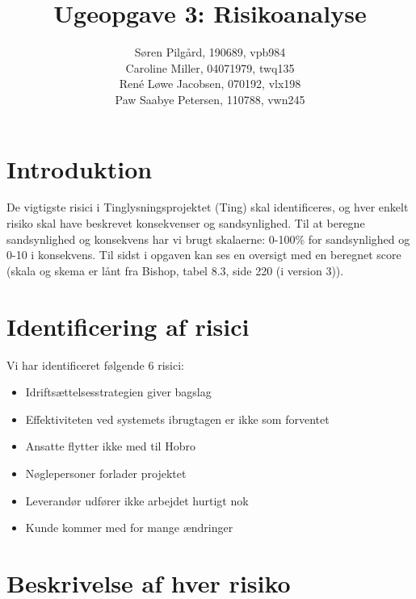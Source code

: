 \documentclass[10pt,a4paper,danish]{article}
\title{Ugeopgave 3: Risikoanalyse}
\author{Søren Pilgård, 190689, vpb984\\
Caroline Miller, 04071979, twq135\\
René Løwe Jacobsen, 070192, vlx198\\
Paw Saabye Petersen, 110788, vwn245}
\begin{document}
\maketitle
\newpage


\section{Introduktion}
De vigtigste risici i Tinglysningsprojektet (Ting) skal identificeres, og hver enkelt risiko skal have beskrevet konsekvenser og sandsynlighed. Til at beregne sandsynlighed og konsekvens har vi brugt skalaerne: 0-100\% for sandsynlighed og 0-10 i konsekvens. Til sidst i opgaven kan ses en oversigt med en beregnet score (skala og skema er lånt fra Bishop, tabel 8.3, side 220 (i version 3)).

\section{Identificering af risici}
Vi har identificeret følgende 6 risici:
\begin{itemize}
\item Idriftsættelsesstrategien giver bagslag
\item Effektiviteten ved systemets ibrugtagen er ikke som forventet
\item Ansatte flytter ikke med til Hobro 
\item Nøglepersoner forlader projektet
\item Leverandør udfører ikke arbejdet hurtigt nok
\item Kunde kommer med for mange ændringer
\end{itemize}

\section{Beskrivelse af hver risiko}
\end{document}
